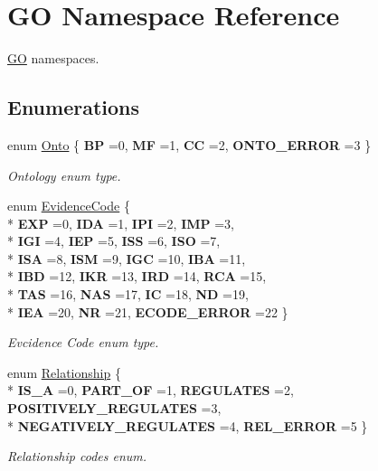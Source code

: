 \hypertarget{namespaceGO}{}\section{GO Namespace Reference}
\label{namespaceGO}


\hyperlink{namespaceGO}{GO} namespaces.  


\subsection*{Enumerations}
\begin{DoxyCompactItemize}
\item 
enum \hyperlink{namespaceGO_a5ae335887b5cf40a9ef3045be9247fc3}{Onto} \{ {\bfseries BP} =0, 
{\bfseries MF} =1, 
{\bfseries CC} =2, 
{\bfseries O\+N\+T\+O\+\_\+\+E\+R\+R\+OR} =3
 \}\begin{DoxyCompactList}\small\item\em Ontology enum type. \end{DoxyCompactList}
\item 
enum \hyperlink{namespaceGO_a4ce5387bbcdaec3648957c7903f2caf3}{Evidence\+Code} \{ \\*
{\bfseries E\+XP} =0, 
{\bfseries I\+DA} =1, 
{\bfseries I\+PI} =2, 
{\bfseries I\+MP} =3, 
\\*
{\bfseries I\+GI} =4, 
{\bfseries I\+EP} =5, 
{\bfseries I\+SS} =6, 
{\bfseries I\+SO} =7, 
\\*
{\bfseries I\+SA} =8, 
{\bfseries I\+SM} =9, 
{\bfseries I\+GC} =10, 
{\bfseries I\+BA} =11, 
\\*
{\bfseries I\+BD} =12, 
{\bfseries I\+KR} =13, 
{\bfseries I\+RD} =14, 
{\bfseries R\+CA} =15, 
\\*
{\bfseries T\+AS} =16, 
{\bfseries N\+AS} =17, 
{\bfseries IC} =18, 
{\bfseries ND} =19, 
\\*
{\bfseries I\+EA} =20, 
{\bfseries NR} =21, 
{\bfseries E\+C\+O\+D\+E\+\_\+\+E\+R\+R\+OR} =22
 \}\begin{DoxyCompactList}\small\item\em Evcidence Code enum type. \end{DoxyCompactList}
\item 
enum \hyperlink{namespaceGO_aaa3905b2e000a8be411da8038827f993}{Relationship} \{ \\*
{\bfseries I\+S\+\_\+A} =0, 
{\bfseries P\+A\+R\+T\+\_\+\+OF} =1, 
{\bfseries R\+E\+G\+U\+L\+A\+T\+ES} =2, 
{\bfseries P\+O\+S\+I\+T\+I\+V\+E\+L\+Y\+\_\+\+R\+E\+G\+U\+L\+A\+T\+ES} =3, 
\\*
{\bfseries N\+E\+G\+A\+T\+I\+V\+E\+L\+Y\+\_\+\+R\+E\+G\+U\+L\+A\+T\+ES} =4, 
{\bfseries R\+E\+L\+\_\+\+E\+R\+R\+OR} =5
 \}\begin{DoxyCompactList}\small\item\em Relationship codes enum. \end{DoxyCompactList}
\end{DoxyCompactItemize}
